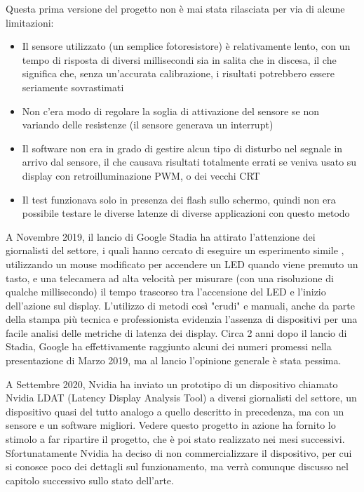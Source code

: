 Questa prima versione del progetto non è mai stata rilasciata per via di alcune limitazioni:
\begin{itemize}
	\item Il sensore utilizzato (un semplice fotoresistore) è relativamente lento\cite{adafruit_photores}, con un tempo di risposta di diversi millisecondi sia in salita che in discesa, il che significa che, senza un'accurata calibrazione, i risultati potrebbero essere seriamente sovrastimati
	\item Non c'era modo di regolare la soglia di attivazione del sensore se non variando delle resistenze (il sensore generava un interrupt)
	\item Il software non era in grado di gestire alcun tipo di disturbo nel segnale in arrivo dal sensore, il che causava risultati totalmente errati se veniva usato su display con retroilluminazione PWM, o dei vecchi CRT
	\item Il test funzionava solo in presenza dei flash sullo schermo, quindi non era possibile testare le diverse latenze di diverse applicazioni con questo metodo
\end{itemize}

A Novembre 2019, il lancio di Google Stadia ha attirato l'attenzione dei giornalisti del settore, i quali hanno cercato di eseguire un esperimento simile\cite{gamersnexus_stadia} \cite{gamersnexus_stadia2}, utilizzando un mouse modificato per accendere un LED quando viene premuto un tasto, e una telecamera ad alta velocità per misurare (con una risoluzione di qualche millisecondo) il tempo trascorso tra l'accensione del LED e l'inizio dell'azione sul display. L'utilizzo di metodi così "crudi" e manuali, anche da parte della stampa più tecnica e professionista evidenzia l'assenza di dispositivi per una facile analisi delle metriche di latenza dei display. Circa 2 anni dopo il lancio di Stadia, Google ha effettivamente raggiunto alcuni dei numeri promessi nella presentazione di Marzo 2019, ma al lancio l'opinione generale è stata pessima.

A Settembre 2020, Nvidia ha inviato un prototipo di un dispositivo chiamato Nvidia LDAT (Latency Display Analysis Tool) a diversi giornalisti del settore\cite{gamersnexus_nvidialdat}, un dispositivo quasi del tutto analogo a quello descritto in precedenza, ma con un sensore e un software migliori. Vedere questo progetto in azione ha fornito lo stimolo a far ripartire il progetto, che è poi stato realizzato nei mesi successivi. Sfortunatamente Nvidia ha deciso di non commercializzare il dispositivo, per cui si conosce poco dei dettagli sul funzionamento, ma verrà comunque discusso nel capitolo successivo sullo stato dell'arte.

